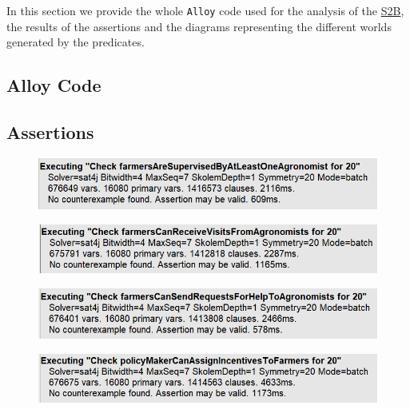 In this section we provide the whole \texttt{Alloy} code used for the analysis of the \hyperref[tab:acronymsTable]{S2B}, the results of the assertions and the diagrams representing the different worlds generated by the predicates.

\subsection{Alloy Code}

\newpage


\subsection{Assertions}

\begin{figure}[H]
    \centering
    \includegraphics[]{Images/Alloy/assertion - farmersAreSupervisedByAtLeastOneAgronomist.png}
    \caption{}
    \label{fig:assertion1}
\end{figure}

\begin{figure}[H]
    \centering
    \includegraphics[]{Images/Alloy/assertion - farmersCanReceiveVisitsFromAgronomists.png}
    \caption{}
    \label{fig:assertion2}
\end{figure}

\begin{figure}[H]
    \centering
    \includegraphics[]{Images/Alloy/assertion - farmersCanSendRequestsForHelpToAgronomists.png}
    \caption{}
    \label{fig:assertion3}
\end{figure}

\begin{figure}[H]
    \centering
    \includegraphics[]{Images/Alloy/assertion - policyMakerCanAssignIncentivesToFarmers.png}
    \caption{}
    \label{fig:assertion4}
\end{figure}

